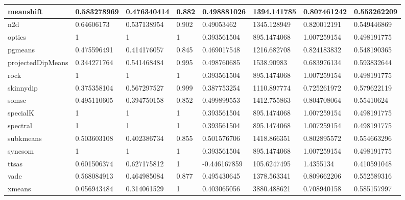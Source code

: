 \begin{table}[H]
\begin{tabular}{|l|l|l|l|l|l|l|l|}
\hline
meanshift & 0.583278969 & 0.476340414 & 0.882 & 0.498881026 & 1394.141785 & 0.807461242 & 0.553262209 \\
\hline
n2d & 0.64606173 & 0.537138954 & 0.902 & 0.49053462 & 1345.128949 & 0.820012191 & 0.549446869 \\
\hline
optics & 1 & 1 & 1 & 0.393561504 & 895.1474068 & 1.007259154 & 0.498191775 \\
\hline
pgmeans & 0.475596491 & 0.414176057 & 0.845 & 0.469017548 & 1216.682708 & 0.824183832 & 0.548190365 \\
\hline
projectedDipMeans & 0.344271764 & 0.541468484 & 0.995 & 0.498760685 & 1538.90983 & 0.683976134 & 0.593832644 \\
\hline
rock & 1 & 1 & 1 & 0.393561504 & 895.1474068 & 1.007259154 & 0.498191775 \\
\hline
skinnydip & 0.375358104 & 0.567297527 & 0.999 & 0.387753254 & 1110.897774 & 0.725261972 & 0.579622119 \\
\hline
somsc & 0.495110605 & 0.394750158 & 0.852 & 0.499899553 & 1412.755863 & 0.804708064 & 0.55410624 \\
\hline
specialK & 1 & 1 & 1 & 0.393561504 & 895.1474068 & 1.007259154 & 0.498191775 \\
\hline
spectral & 1 & 1 & 1 & 0.393561504 & 895.1474068 & 1.007259154 & 0.498191775 \\
\hline
subkmeans & 0.503603108 & 0.402386734 & 0.855 & 0.501576706 & 1418.866351 & 0.802895572 & 0.554663296 \\
\hline
syncsom & 1 & 1 & 1 & 0.393561504 & 895.1474068 & 1.007259154 & 0.498191775 \\
\hline
ttsas & 0.601506374 & 0.627175812 & 1 & -0.446167859 & 105.6247495 & 1.4355134 & 0.410591048 \\
\hline
vade & 0.568084913 & 0.464985084 & 0.877 & 0.495430645 & 1378.563341 & 0.809662206 & 0.552589316 \\
\hline
xmeans & 0.056943484 & 0.314061529 & 1 & 0.403065056 & 3880.488621 & 0.708940158 & 0.585157997 \\
\hline
\end{tabular}
\end{table}